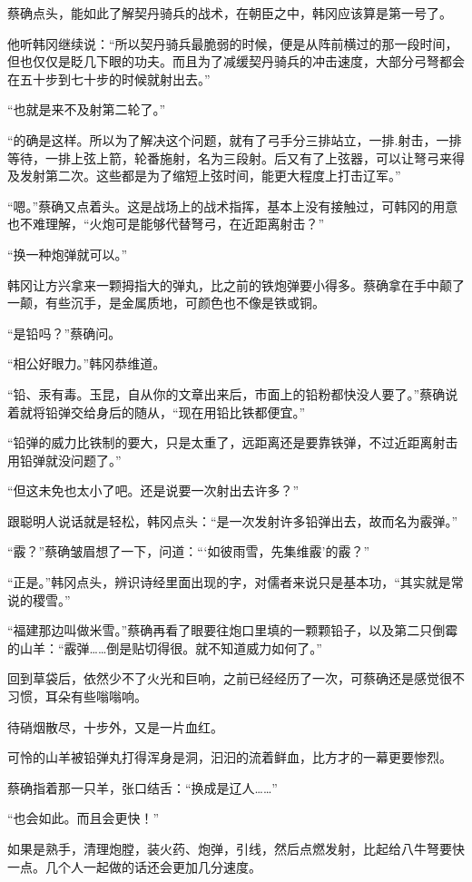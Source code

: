 蔡确点头，能如此了解契丹骑兵的战术，在朝臣之中，韩冈应该算是第一号了。

他听韩冈继续说：“所以契丹骑兵最脆弱的时候，便是从阵前横过的那一段时间，但也仅仅是眨几下眼的功夫。而且为了减缓契丹骑兵的冲击速度，大部分弓弩都会在五十步到七十步的时候就射出去。”

“也就是来不及射第二轮了。”

“的确是这样。所以为了解决这个问题，就有了弓手分三排站立，一排.射击，一排等待，一排上弦上箭，轮番施射，名为三段射。后又有了上弦器，可以让弩弓来得及发射第二次。这些都是为了缩短上弦时间，能更大程度上打击辽军。”

“嗯。”蔡确又点着头。这是战场上的战术指挥，基本上没有接触过，可韩冈的用意也不难理解，“火炮可是能够代替弩弓，在近距离射击？”

“换一种炮弹就可以。”

韩冈让方兴拿来一颗拇指大的弹丸，比之前的铁炮弹要小得多。蔡确拿在手中颠了一颠，有些沉手，是金属质地，可颜色也不像是铁或铜。

“是铅吗？”蔡确问。

“相公好眼力。”韩冈恭维道。

“铅、汞有毒。玉昆，自从你的文章出来后，市面上的铅粉都快没人要了。”蔡确说着就将铅弹交给身后的随从，“现在用铅比铁都便宜。”

“铅弹的威力比铁制的要大，只是太重了，远距离还是要靠铁弹，不过近距离射击用铅弹就没问题了。”

“但这未免也太小了吧。还是说要一次射出去许多？”

跟聪明人说话就是轻松，韩冈点头：“是一次发射许多铅弹出去，故而名为霰弹。”

“霰？”蔡确皱眉想了一下，问道：“‘如彼雨雪，先集维霰’的霰？”

“正是。”韩冈点头，辨识诗经里面出现的字，对儒者来说只是基本功，“其实就是常说的稷雪。”

“福建那边叫做米雪。”蔡确再看了眼要往炮口里填的一颗颗铅子，以及第二只倒霉的山羊：“霰弹……倒是贴切得很。就不知道威力如何了。”

回到草袋后，依然少不了火光和巨响，之前已经经历了一次，可蔡确还是感觉很不习惯，耳朵有些嗡嗡响。

待硝烟散尽，十步外，又是一片血红。

可怜的山羊被铅弹丸打得浑身是洞，汩汩的流着鲜血，比方才的一幕更要惨烈。

蔡确指着那一只羊，张口结舌：“换成是辽人……”

“也会如此。而且会更快！”

如果是熟手，清理炮膛，装火药、炮弹，引线，然后点燃发射，比起给八牛弩要快一点。几个人一起做的话还会更加几分速度。

